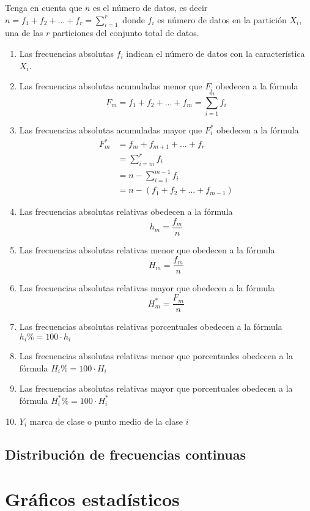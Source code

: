 \documentclass[a4paper]{report}
\begin{document}
Tenga en cuenta que $n$ es el número de datos, es decir $n=f_1+f_2+\ldots+f_r=\sum_{i=1}^r$ donde $f_i$ es número de datos en la partición $X_i$, una de las $r$ particiones del conjunto total de datos.

\begin{enumerate}
  \item  Las frecuencias absolutas $f_i$ indican el número de datos con la característica $X_i$.
  \item   Las frecuencias absolutas acumuladas menor que $F_i$ obedecen a la fórmula $$F_m=f_1+f_2+\ldots+f_m=\sum_{i=1}^mf_i$$
  \item   Las frecuencias absolutas acumuladas mayor que $F_i^*$ obedecen a la fórmula
  $$
  \begin{aligned}
    F_m^*&=f_m+f_{m+1}+\ldots+f_r\\
    &=\sum_{i=m}^rf_i\\
    &=n-\sum_{i=1}^{m-1}f_i\\
    &=n-\left(f_1+f_{2}+\ldots+f_{m-1}\right)
  \end{aligned}
  $$
  \item   Las frecuencias absolutas relativas obedecen a la fórmula $$h_m=\frac{f_m}{n}$$
  \item   Las frecuencias absolutas relativas menor que obedecen a la fórmula $$H_m=\frac{f_m}{n}$$
  \item   Las frecuencias absolutas relativas mayor que obedecen a la fórmula $$H_m^*=\frac{F_m}{n}$$
  \item   Las frecuencias absolutas relativas porcentuales obedecen a la fórmula $h_i\%=100\cdot h_i$
  \item  Las frecuencias absolutas relativas menor que porcentuales obedecen a la fórmula $H_i\%=100\cdot H_i$
  \item   Las frecuencias absolutas relativas mayor que porcentuales obedecen a la fórmula $H_i^*\%=100\cdot H_i^*$
  \item  $Y_i$ marca de clase o punto medio de la clase $i$
\end{enumerate}


\subsection{Distribución de frecuencias continuas}


\section{Gráficos estadísticos}
\end{document}
